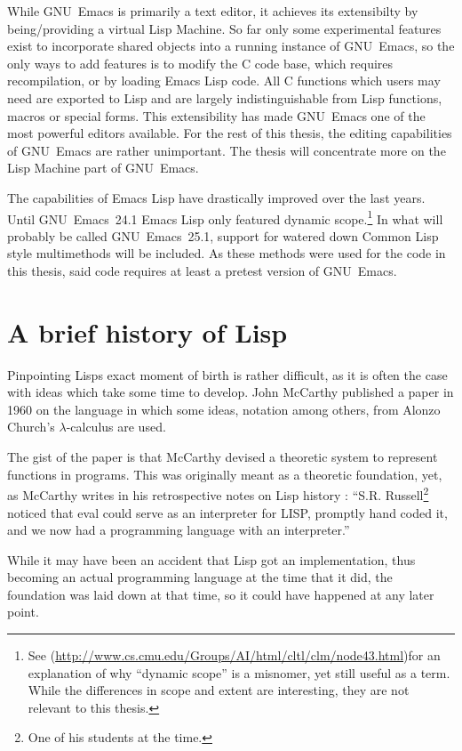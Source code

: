 \documentclass[a4paper,10pt,twoside]{report}
\newcommand{\el}{Emacs Lisp}
\newcommand{\cl}{Common Lisp}
\newcommand{\emacs}{GNU~Emacs}
\newcommand{\emacsv}[1]{GNU~Emacs~#1}
\begin{document}
While \emacs{} is primarily a text editor, it achieves its extensibilty by
being/providing a virtual Lisp Machine.  So far only some experimental features
exist to incorporate shared objects into a running instance of \emacs{}, so the
only ways to add features is to modify the C code base, which requires
recompilation, or by loading \el{} code.  All C functions which users may need
are exported to Lisp and are largely indistinguishable from Lisp functions,
macros or special forms.  This extensibility has made \emacs{} one of the most
powerful editors available.  For the rest of this thesis, the editing
capabilities of \emacs{} are rather unimportant.  The thesis will concentrate
more on the Lisp Machine part of \emacs{}.

The capabilities of \el{} have drastically improved over the last years.  Until
\emacsv{24.1} \el{} only featured dynamic
scope\cite{Emacs-Lexical}.\footnote{See \cite{CLTL2}
  (\url{http://www.cs.cmu.edu/Groups/AI/html/cltl/clm/node43.html})for an
  explanation of why ``dynamic scope'' is a misnomer, yet still useful as a
  term.  While the differences in scope and extent are interesting, they are not
  relevant to this thesis.}  In what will probably be called \emacsv{25.1},
support for watered down \cl{} style multimethods will be included.  As these
methods were used for the code in this thesis, said code requires at least a
pretest version of \emacs{}\cite{emacs-pretest}.

\section{A brief history of Lisp}
\label{sec:lisp-hist}

Pinpointing Lisps exact moment of birth is rather difficult, as it is often the
case with ideas which take some time to develop.  John McCarthy published a
paper in 1960 on the language\cite{rec-fun-sym-expr} in which some ideas,
notation among others, from Alonzo Church’s $\lambda$-calculus are used.

The gist of the paper is that McCarthy devised a theoretic system to represent
functions in programs.  This was originally meant as a theoretic foundation,
yet, as McCarthy writes in his retrospective notes on Lisp history
\cite{lisp-hist}: “S.R. Russell\footnote{One of his students at the time.}
noticed that eval could serve as an interpreter for LISP, promptly hand coded
it, and we now had a programming language with an interpreter.”

While it may have been an accident that Lisp got an implementation, thus
becoming an actual programming language at the time that it did, the foundation
was laid down at that time, so it could have happened at any later point.
\end{document}
